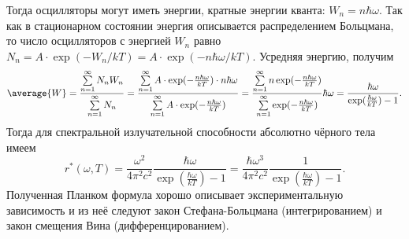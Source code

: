 Тогда осцилляторы могут иметь энергии, кратные энергии кванта:
\( W_n = n\hbar\omega \). Так как в стационарном состоянии энергия описывается
распределением Больцмана, то число осцилляторов с энергией \( W_n \) равно
\( N_n = A\cdot\exp(-W_n/kT) = A\cdot\exp(-n\hbar\omega/kT) \). Усредняя
энергию, получим
\[
    \average{W} =
    \frac{\sum\limits_{n=1}^\infty N_nW_n}{\sum\limits_{n=1}^\infty N_n} = 
    \frac{\sum\limits_{n=1}^\infty A\cdot\exp(-\frac{n\hbar\omega}{kT})\cdot
    n\hbar\omega}{\sum\limits_{n=1}^\infty A\cdot\exp(-\frac{n\hbar\omega}{kT})} =
    \frac{\sum\limits_{n=1}^\infty n\exp(-\frac{n\hbar\omega}{kT})}
    {\sum\limits_{n=1}^\infty \exp(-\frac{n\hbar\omega}{kT})}\hbar\omega =
    \frac{\hbar\omega}{\exp(\frac{\hbar\omega}{kT}) - 1}.
\]
Тогда для спектральной излучательной способности абсолютно чёрного тела имеем
\[
    r^*(\omega, T) = \frac{\omega^2}{4\pi^2c^2}
    \frac{\hbar\omega}{\exp(\frac{\hbar\omega}{kT}) - 1} = \frac{\hbar\omega^3}
    {4\pi^2c^2}\frac{1}{\exp(\frac{\hbar\omega}{kT}) - 1}.
\]
Полученная Планком формула хорошо описывает экспериментальную зависимость и из
неё следуют закон Стефана-Больцмана (интегрированием) и закон смещения Вина
(дифференцированием).
\newpage

